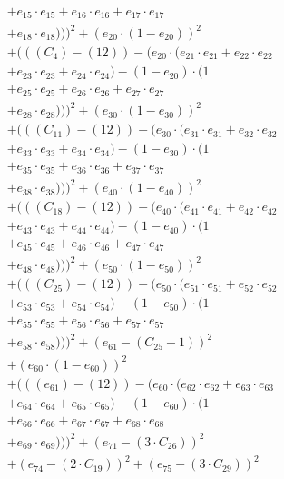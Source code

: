 \documentclass[10pt, a4paper]{article}
\begin{document}
\begin{small}
\begin{align*}
& + e_{15} \cdot e_{15} + e_{16} \cdot e_{16} + e_{17} \cdot e_{17} \\
& + e_{18} \cdot e_{18})))^{2} + (e_{20} \cdot (1 - e_{20}))^{2} \\
& + (((C_{4}) - (12)) - (e_{20} \cdot (e_{21} \cdot e_{21} + e_{22} \cdot e_{22} \\
& + e_{23} \cdot e_{23} + e_{24} \cdot e_{24}) - (1 - e_{20}) \cdot (1 \\
& + e_{25} \cdot e_{25} + e_{26} \cdot e_{26} + e_{27} \cdot e_{27} \\
& + e_{28} \cdot e_{28})))^{2} + (e_{30} \cdot (1 - e_{30}))^{2} \\
& + (((C_{11}) - (12)) - (e_{30} \cdot (e_{31} \cdot e_{31} + e_{32} \cdot e_{32} \\
& + e_{33} \cdot e_{33} + e_{34} \cdot e_{34}) - (1 - e_{30}) \cdot (1 \\
& + e_{35} \cdot e_{35} + e_{36} \cdot e_{36} + e_{37} \cdot e_{37} \\
& + e_{38} \cdot e_{38})))^{2} + (e_{40} \cdot (1 - e_{40}))^{2} \\
& + (((C_{18}) - (12)) - (e_{40} \cdot (e_{41} \cdot e_{41} + e_{42} \cdot e_{42} \\
& + e_{43} \cdot e_{43} + e_{44} \cdot e_{44}) - (1 - e_{40}) \cdot (1 \\
& + e_{45} \cdot e_{45} + e_{46} \cdot e_{46} + e_{47} \cdot e_{47} \\
& + e_{48} \cdot e_{48})))^{2} + (e_{50} \cdot (1 - e_{50}))^{2} \\
& + (((C_{25}) - (12)) - (e_{50} \cdot (e_{51} \cdot e_{51} + e_{52} \cdot e_{52} \\
& + e_{53} \cdot e_{53} + e_{54} \cdot e_{54}) - (1 - e_{50}) \cdot (1 \\
& + e_{55} \cdot e_{55} + e_{56} \cdot e_{56} + e_{57} \cdot e_{57} \\
& + e_{58} \cdot e_{58})))^{2} + (e_{61} - (C_{25} + 1))^{2} \\
& + (e_{60} \cdot (1 - e_{60}))^{2} \\
& + (((e_{61}) - (12)) - (e_{60} \cdot (e_{62} \cdot e_{62} + e_{63} \cdot e_{63} \\
& + e_{64} \cdot e_{64} + e_{65} \cdot e_{65}) - (1 - e_{60}) \cdot (1 \\
& + e_{66} \cdot e_{66} + e_{67} \cdot e_{67} + e_{68} \cdot e_{68} \\
& + e_{69} \cdot e_{69})))^{2} + (e_{71} - (3  \cdot  C_{26}))^{2} \\
& + (e_{74} - (2  \cdot  C_{19}))^{2} + (e_{75} - (3  \cdot  C_{29}))^{2} \\

\end{align*}
\end{small}
\end{document}
